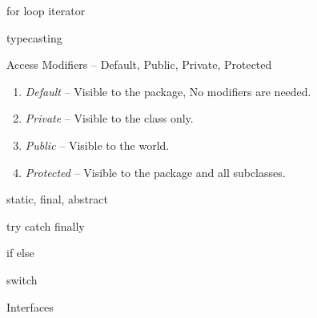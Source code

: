 \documentclass[11pt]{beamer}
\begin{document}
\begin{frame}{for loop iterator}

\end{frame}



\begin{frame}{typecasting}

\end{frame}



\begin{frame}{Access Modifiers -- Default, Public, Private, Protected}

\begin{enumerate}
\item \emph{Default} -- Visible to the package,  No modifiers are needed.
\item \emph{Private} -- Visible to the class only.
\item \emph{Public} -- Visible to the world.
\item \emph{Protected} -- Visible to the package and all subclasses.    
\end{enumerate}






\end{frame}



\begin{frame}{static, final, abstract}

\end{frame}



\begin{frame}[containsverbatim]{try catch finally}

\end{frame}


\begin{frame}{if else}

\end{frame}



\begin{frame}{switch}

\end{frame}


\begin{frame}{Interfaces}

\end{frame}
\end{document}
